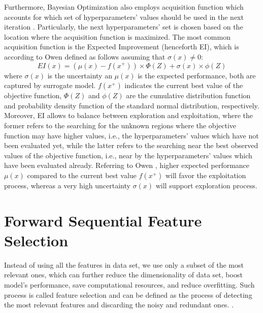 Furthermore, Bayesian Optimization also employs acquisition function which accounts for which set of hyperparameters' values should be used in the next iteration \citep{owen2022hyperparameter}. Particularly, the next hyperparameters' set is chosen based on the location where the acquisition function is maximized.
The most common acquisition function is the Expected Improvement (henceforth EI), which is according to Owen \citep{owen2022hyperparameter} defined as follows assuming that $ \sigma\left(x\right) \neq 0$:
\begin{equation}\label{eq}
    EI(x) = \left(\mu\left(x\right) - f\left(x^{+}\right)\right) \times \Phi\left(Z\right) + \sigma\left(x\right) \times \phi\left(Z\right)
\end{equation}
where $\sigma\left(x\right)$ is the uncertainty an $\mu\left(x\right)$ is the expected performance, both are captured by surrogate model. $f\left(x^{+}\right)$ indicates the current best value of the objective function, $\Phi\left(Z\right)$ and $\phi\left(Z\right)$ are the cumulative distribution function and probability density function of the standard normal distribution, respectively.
Moreover, EI allows to balance between exploration and exploitation, where the former refers to the searching for the unknown regions where the objective function may have higher values, i.e., the hyperparameters' values which have not been evaluated yet, while the latter refers to the searching near the best observed values of the objective function, i.e., near by the hyperparameters' values which have been evaluated already.
Referring to Owen \citep{owen2022hyperparameter}, higher expected performance $\mu\left(x\right)$ compared to the current best value $f\left(x^{+}\right)$ will favor the exploitation process, whereas a very high uncertainty $\sigma\left(x\right)$ will support exploration process.

\newpage
\section{Forward Sequential Feature Selection}
\label{sec:fsfstheory}
Instead of using all the features in data set, we use only a subset of the most relevant ones, which can further reduce the dimensionality of data set, boost model's performance, save computational resources, and reduce overfitting. Such process is called feature selection and can be defined as the process of detecting the most relevant features and discarding the noisy and redundant ones. \citep{bolon2015feature}.

